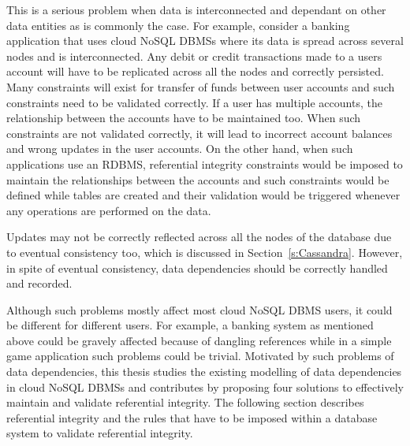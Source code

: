 This is a serious problem when data is interconnected and dependant on other
data entities as is commonly the case.  For example,   consider a banking
application that uses cloud \ac{NoSQL} \acp{DBMS} where its data is spread
across several nodes and is interconnected.  Any debit or credit transactions
made to a users account will have to be replicated across all the
nodes and correctly persisted.  Many constraints will exist for transfer of funds
between user accounts and such constraints need to be validated correctly.  If a
user has multiple accounts,   the relationship between the accounts have to be
maintained too.  When such constraints are not validated correctly,   it will lead
to incorrect account balances and wrong updates in the user accounts.  On the
other hand,   when such applications use an \ac{RDBMS},   referential integrity
constraints would be imposed to maintain the relationships between the accounts
and such constraints would be defined while tables are created and their
validation would be triggered whenever any operations are performed on the data.

Updates may not be correctly reflected across all the nodes of the database due
to  eventual consistency too,   which is discussed in Section~\ref{s:Cassandra}.
However, in spite of eventual consistency,   data dependencies should be
correctly handled and recorded.

Although such problems mostly affect most cloud \ac{NoSQL} \ac{DBMS} users,   it
could be different for different users.  For example, a banking system as
mentioned above could be gravely affected because of dangling references while
in a simple game application such problems could be trivial. 
Motivated by such
problems of data dependencies, this thesis studies the existing modelling of
data dependencies in cloud \ac{NoSQL} \acp{DBMS} and contributes by proposing
four solutions to effectively maintain and validate referential integrity.
The following section describes referential integrity and the rules that have to
be imposed within a database system to validate referential integrity.

